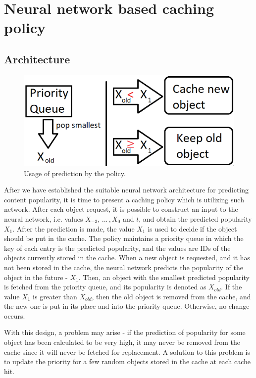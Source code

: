 \section{Neural network based caching policy} \label{caching_policy}

\subsection{Architecture} \label{architecture}

\begin{figure}[b!]
	\centering
	\includegraphics[width=0.75\linewidth]{pics/cache2.png}
	\caption{Usage of prediction by the policy.}
	\label{fig:cache2}
\end{figure}

After we have established the suitable neural network architecture for predicting content popularity, it is time to present a caching policy which is utilizing such network. After each object request, it is possible to construct an input to the neural network, i.e. values $X_{-3}, \, ... \, , X_{0}$ and $t$, and obtain the predicted popularity $X_{1}$. After the prediction is made, the value $X_1$ is used to decide if the object should be put in the cache. The policy maintains a priority queue in which the key of each entry is the predicted popularity, and the values are IDs of the objects currently stored in the cache. When a new object is requested, and it has not been stored in the cache, the neural network predicts the popularity of the object in the future - $X_1$. Then, an object with the smallest predicted popularity is fetched from the priority queue, and its popularity is denoted as $X_{old}$. If the value $X_1$ is greater than $X_{old}$, then the old object is removed from the cache, and the new one is put in its place and into the priority queue. Otherwise, no change occurs.

With this design, a problem may arise - if the prediction of popularity for some object has been calculated to be very high, it may never be removed from the cache since it will never be fetched for replacement. A solution to this problem is to update the priority for a few random objects stored in the cache at each cache hit.

